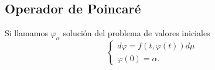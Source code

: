  	
 	
 	
 	




 \subsection{Operador de Poincaré} 
Si llamamos $\varphi_\alpha$  solución  del problema de valores iniciales
 \begin{equation}
 	\left\lbrace \begin{array}{l}
 		d\varphi=f(t,\varphi(t))d\mu\\
 		\varphi(0)=\alpha.
 	\end{array}\right. \label{eq:Problema 0}
 \end{equation}

